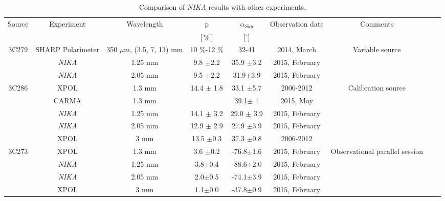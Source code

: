 \documentclass[twocolumn,traditabstract]{aa}
\begin{document}
\begin{table}
\begin{center}
\begin{tabular}{ccccccccc}
\hline
\hline
Source & Experiment & Wavelength & p & $\alpha_{Sky}$ & Observation date & Comments\\
 & & & $[ \%]$&[$^\circ$]\\
\hline
3C279 &  SHARP Polarimeter &  350 $\mu$m, (3.5, 7, 13) mm &  10 $\%$-12 $\%$ & 32-41 &  2014, March & Variable source\\
           &  {\it NIKA}  & 1.25 mm & 9.8 $\pm$2.2 & 35.9 $\pm$3.2 & 2015, February  \\ 
	   &  {\it NIKA}  & 2.05 mm & 9.5 $\pm$2.2 & 31.9$\pm$3.9 & 2015, February\\ 
3C286 & XPOL & 1.3 mm & 14.4 $\pm$ 1.8 & 33.1 $\pm$5.7 & 2006-2012 & Calibration source\\
	   & CARMA & 1.3 mm & & 39.1$\pm$ 1 & 2015, May \\
	   & {\it NIKA}  &  1.25 mm &  14.1 $\pm$ 3.2 & 29.0 $\pm$ 3.9 & 2015, February\\	
	   & {\it NIKA}  &    2.05 mm &  12.9 $\pm$ 2.9 & 27.9 $\pm$3.9 & 2015, February \\
           & XPOL & 3 mm & 13.5 $\pm$0.3 & 37.3 $\pm$0.8 & 2006-2012 \\
3C273 & XPOL &   1.3 mm  &  3.6 $\pm$0.2 & -76.8$\pm$1.6 & 2015, February & Observational parallel session\\
        	   & {\it NIKA}   &   1.25 mm & 3.8$\pm$0.4 & -88.6$\pm$2.0 & 2015, February\\
           & {\it NIKA}  &    2.05 mm & 2.0$\pm$0.5 & -74.1$\pm$3.9 & 2015, February\\
           & XPOL &    3 mm    &   1.1$\pm$0.0 & -37.8$\pm$0.9 & 2015, February\\

\hline
\end{tabular}
\caption{  Comparison of {\it NIKA}  results with other experiments.}
\label{tab:tab_quasar}
\end{center}
\end{table}
\endlandscape



        
\end{document}
